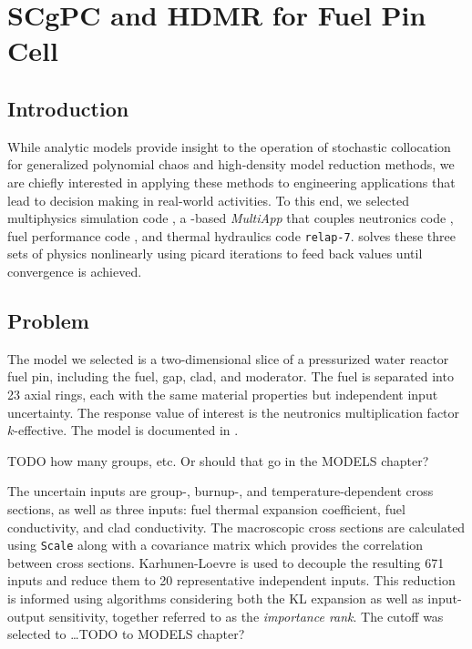 
\chapter{SCgPC and HDMR for Fuel Pin Cell} %

\label{ch:mammoth} %



\section{Introduction}
While analytic models provide insight to the operation of stochastic collocation for generalized polynomial chaos and high-density
model reduction methods, we are chiefly interested in applying these methods to engineering applications that lead to
decision making in real-world activities.  To this end, we selected multiphysics simulation code \mammoth{}, a \moose{}-based
\emph{MultiApp} that couples neutronics code \rattlesnake{}, fuel performance code \bison{}, and thermal hydraulics code
\texttt{relap-7}.  \mammoth{} solves these three sets of physics nonlinearly using picard iterations to feed back values until
convergence is achieved.

\section{Problem}
The model we selected is a two-dimensional slice of a pressurized water reactor fuel pin, including the fuel, gap, clad, and
moderator.  The fuel is separated into 23 axial rings, each with the same material properties but independent input uncertainty.
The response value of interest is the neutronics multiplication factor $k$-effective.  The model is documented
in \cite{physormammoth}.

TODO how many groups, etc.  Or should that go in the MODELS chapter?

The uncertain inputs are group-, burnup-, and temperature-dependent cross sections, as well as three \bison{}
inputs: fuel thermal expansion coefficient, fuel conductivity, and clad conductivity.
The macroscopic cross sections are calculated using \texttt{Scale} \cite{scale} along with a covariance matrix which provides
the correlation between cross sections.  Karhunen-Loevre \cite{karhunen} is used to decouple the resulting 671 inputs and
reduce them to 20 representative independent inputs.  This reduction is informed using \raven{} algorithms
considering both the KL expansion as well as input-output sensitivity, together referred to as the
\emph{importance rank}.  The cutoff was selected to \ldots TODO to MODELS chapter?

